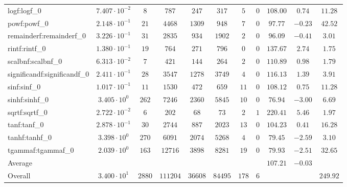 \begin{tabular}{|l|c|c|c|c|c|c|c|c|c|c|}
logf:logf\_0                 & $ 7.407 \cdot 10^{-2} $ & $ 8      $ & $ 787    $ & $ 247   $ & $ 317   $ & $ 5   $ & $ 0 $ & $ 108.00      $ & $ 0.74    $ & $ 11.28   $ \\
powf:powf\_0                 & $ 2.148 \cdot 10^{-1} $ & $ 21     $ & $ 4468   $ & $ 1309  $ & $ 948   $ & $ 7   $ & $ 0 $ & $ 97.77       $ & $ -0.23   $ & $ 42.52   $ \\
remainderf:remainderf\_0     & $ 3.226 \cdot 10^{-1} $ & $ 31     $ & $ 2835   $ & $ 934   $ & $ 1902  $ & $ 2   $ & $ 0 $ & $ 96.09       $ & $ -0.41   $ & $ 3.01    $ \\
rintf:rintf\_0               & $ 1.380 \cdot 10^{-1} $ & $ 19     $ & $ 764    $ & $ 271   $ & $ 796   $ & $ 0   $ & $ 0 $ & $ 137.67      $ & $ 2.74    $ & $ 1.75    $ \\
scalbnf:scalbnf\_0           & $ 6.313 \cdot 10^{-2} $ & $ 7      $ & $ 421    $ & $ 144   $ & $ 264   $ & $ 2   $ & $ 0 $ & $ 110.89      $ & $ 0.98    $ & $ 1.79    $ \\
significandf:significandf\_0 & $ 2.411 \cdot 10^{-1} $ & $ 28     $ & $ 3547   $ & $ 1278  $ & $ 3749  $ & $ 4   $ & $ 0 $ & $ 116.13      $ & $ 1.39    $ & $ 3.91    $ \\
sinf:sinf\_0                 & $ 1.017 \cdot 10^{-1} $ & $ 11     $ & $ 1530   $ & $ 472   $ & $ 659   $ & $ 11  $ & $ 0 $ & $ 108.12      $ & $ 0.75    $ & $ 11.28   $ \\
sinhf:sinhf\_0               & $ 3.405 \cdot 10^{0}  $ & $ 262    $ & $ 7246   $ & $ 2360  $ & $ 5845  $ & $ 10  $ & $ 0 $ & $ 76.94       $ & $ -3.00   $ & $ 6.69    $ \\
sqrtf:sqrtf\_0               & $ 2.722 \cdot 10^{-2} $ & $ 6      $ & $ 202    $ & $ 68    $ & $ 73    $ & $ 2   $ & $ 1 $ & $ 220.41      $ & $ 5.46    $ & $ 1.97    $ \\
tanf:tanf\_0                 & $ 2.878 \cdot 10^{-1} $ & $ 30     $ & $ 2744   $ & $ 887   $ & $ 2023  $ & $ 13  $ & $ 0 $ & $ 104.23      $ & $ 0.41    $ & $ 16.28   $ \\
tanhf:tanhf\_0               & $ 3.398 \cdot 10^{0}  $ & $ 270    $ & $ 6091   $ & $ 2074  $ & $ 5268  $ & $ 4   $ & $ 0 $ & $ 79.45       $ & $ -2.59   $ & $ 3.10    $ \\
tgammaf:tgammaf\_0           & $ 2.039 \cdot 10^{0}  $ & $ 163    $ & $ 12716  $ & $ 3898  $ & $ 8281  $ & $ 19  $ & $ 0 $ & $ 79.93       $ & $ -2.51   $ & $ 32.65   $ \\
\hline
Average                      & $                     $ & $        $ & $        $ & $       $ & $       $ & $     $ & $   $ & $ 107.21      $ & $ -0.03   $ & $         $ \\
\hline
Overall                      & $ 3.400 \cdot 10^{1}  $ & $ 2880   $ & $ 111204 $ & $ 36608 $ & $ 84495 $ & $ 178 $ & $ 6 $ & $             $ & $         $ & $ 249.92  $ \\
\hline
\end{tabular}
